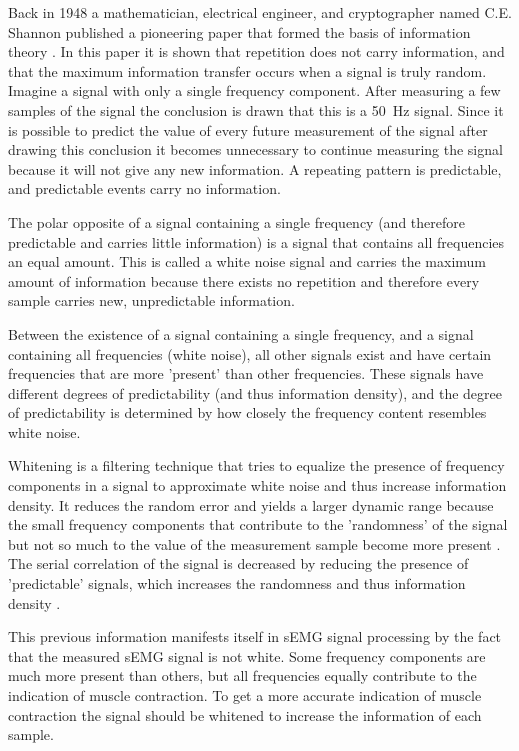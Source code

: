 Back in 1948 a mathematician, electrical engineer, and cryptographer named C.E. Shannon published a pioneering paper that formed the basis of information theory \cite{shannon}. In this paper it is shown that repetition does not carry information, and that the maximum information transfer occurs when a signal is truly random. Imagine a signal with only a single frequency component. After measuring a few samples of the signal the conclusion is drawn that this is a \SI{50}{\hertz} signal. Since it is possible to predict the value of every future measurement of the signal after drawing this conclusion it becomes unnecessary to continue measuring the signal because it will not give any new information. A repeating pattern is predictable, and predictable events carry no information.

The polar opposite of a signal containing a single frequency (and therefore predictable and carries little information) is a signal that contains all frequencies an equal amount. This is called a white noise signal and carries the maximum amount of information because there exists no repetition and therefore every sample carries new, unpredictable information.

Between the existence of a signal containing a single frequency, and a signal containing all frequencies (white noise), all other signals exist and have certain frequencies that are more 'present' than other frequencies. These signals have different degrees of predictability (and thus information density), and the degree of predictability is determined by how closely the frequency content resembles white noise.

Whitening is a filtering technique that tries to equalize the presence of frequency components in a signal to approximate white noise and thus increase information density. It reduces the random error and yields a larger dynamic range because the small frequency components that contribute to the 'randomness' of the signal but not so much to the value of the measurement sample become more present \cite[Ch. 5.4.9]{time_series_analysis_methods}\cite{single_site_emg_amplitude_estimation}. The serial correlation of the signal is decreased by reducing the presence of 'predictable' signals, which increases the randomness and thus information density \cite{serial_correlation_definition}. 

This previous information manifests itself in sEMG signal processing by the fact that the measured sEMG signal is not white. Some frequency components are much more present than others, but all frequencies equally contribute to the indication of muscle contraction. To get a more accurate indication of muscle contraction the signal should be whitened to increase the information of each sample.

